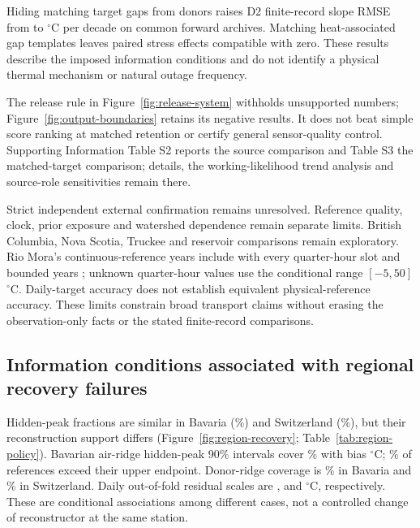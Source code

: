 \documentclass[draft,linenumbers]{agujournal2025}
\begin{document}
Hiding matching target gaps from donors raises D2 finite-record slope RMSE from \ESBaseline{} to \ESDonor{}$^{\circ}$C per decade on \ESArchives{} common forward archives. Matching heat-associated gap templates leaves paired stress effects compatible with zero. These results describe the imposed information conditions and do not identify a physical thermal mechanism or natural outage frequency.

The release rule in Figure~\ref{fig:release-system} withholds unsupported numbers; Figure~\ref{fig:output-boundaries} retains its negative results. It does not beat simple score ranking at matched retention or certify general sensor-quality control. Supporting Information Table S2 reports the source comparison and Table S3 the matched-target comparison; details, the working-likelihood trend analysis and source-role sensitivities remain there.

Strict independent external confirmation remains unresolved. Reference quality, clock, prior exposure and watershed dependence remain separate limits. British Columbia, Nova Scotia, Truckee and reservoir comparisons remain exploratory. Rio Mora's continuous-reference years include \RioCompleteQuarterYear{} with every quarter-hour slot and bounded years \RioBoundedYears{}; unknown quarter-hour values use the conditional range $[-5,50]$ $^{\circ}$C. Daily-target accuracy does not establish equivalent physical-reference accuracy. These limits constrain broad transport claims without erasing the observation-only facts or the stated finite-record comparisons.

\subsection{Information conditions associated with regional recovery failures}
Hidden-peak fractions are similar in Bavaria (\PRBavariaHiddenFrac\%) and Switzerland (\PRFoenHiddenFrac\%), but their reconstruction support differs (Figure~\ref{fig:region-recovery}; Table~\ref{tab:region-policy}). Bavarian air-ridge hidden-peak 90\% intervals cover \PRBavariaHiddenAirCov\% with bias \PRBavariaHiddenAirBias{}$^{\circ}$C; \PRBavariaHiddenAirAbove\% of references exceed their upper endpoint. Donor-ridge coverage is \PRBavariaHiddenDonorCov\% in Bavaria and \PRFoenHiddenDonorCov\% in Switzerland. Daily out-of-fold residual scales are \PRBavariaAirDailySd{}, \PRBavariaDonorDailySd{} and \PRFoenDonorDailySd{}$^{\circ}$C, respectively. These are conditional associations among different cases, not a controlled change of reconstructor at the same station.
\end{document}

